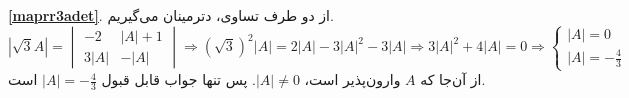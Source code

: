 \df \\ \textbf{\ref{maprr3adet}}.
از دو طرف تساوی، دترمینان می‌گیریم.
\[
\left| \sqrt{3}A \right| =
\begin{vmatrix}
	-2 & |A|+1 \\
	3|A| & -|A|
\end{vmatrix}
\Rightarrow
\left( \sqrt{3} \right)^2 |A| = 2|A| - 3|A|^2 -3|A|
\Rightarrow
3|A|^2+4|A|=0
\Rightarrow
\begin{cases}
	|A|=0 \\
	|A|=-\frac{4}{3}
\end{cases}
\]
از آن‌جا که $A$ وارون‌پذیر است،
$|A| \neq 0$.
پس تنها جواب قابل قبول
$|A| = -\frac{4}{3}$
است.

\df
